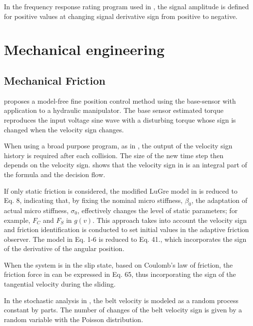 \documentclass[11pt]{book}
\begin{document}
In the frequency response rating program used in \cite{shokhin2017use},
the signal amplitude is defined for positive values at changing signal
derivative sign from positive to negative.


\section{Mechanical engineering}


\subsection{Mechanical Friction}

\cite{morel1996precise} proposes a model-free fine position control method using the base-sensor with application to a hydraulic manipulator. The base sensor estimated torque reproduces the input voltage sine wave with a disturbing torque whose sign is
changed when the velocity sign changes.

When using a broad purpose program, as in \cite{dimova2000numerical},
the output of the velocity sign history is required after each collision.
The size of the new time step then depends on the velocity sign. \cite{ryu2001nonlinear} shows that the velocity sign in  is an integral part of the formula and the decision flow.

If only static friction is considered, the modified LuGre model in
\cite{chen2014dual} is reduced to Eq. 8, indicating that, by fixing
the nominal micro stiffness, $\beta_{0}$, the adaptation of actual
micro stiffness, $\sigma_{0}$, effectively changes the level of static
parameters; for example, $F_{C}$ and $F_{S}$ in $g\left(v\right)$.
This approach takes into account the velocity sign and friction identification
is conducted to set initial values in the adaptive friction observer.
The model in Eq. 1-6 is reduced to Eq. 41., which incorporates the
sign of the derivative of the angular position.

When the system is in the slip state, based on Coulomb's law of friction,
the friction force in \cite{yuan2016new} can be expressed in Eq.
65, thus incorporating the sign of the tangential velocity during
the sliding.

In the stochastic analysis in \cite{lima2016stochastic}, the belt
velocity is modeled as a random process constant by parts. The number
of changes of the belt velocity sign is given by a random variable
with the Poisson distribution.
\end{document}
